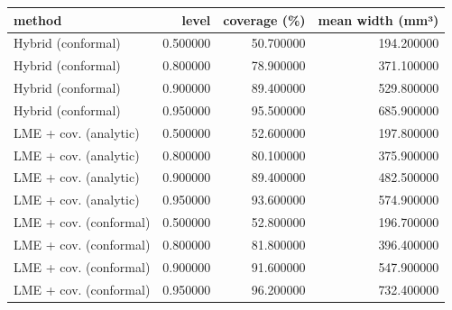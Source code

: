\begin{tabular}{lrrr}
\toprule
method & level & coverage (\%) & mean width (mm³) \\
\midrule
Hybrid (conformal) & 0.500000 & 50.700000 & 194.200000 \\
Hybrid (conformal) & 0.800000 & 78.900000 & 371.100000 \\
Hybrid (conformal) & 0.900000 & 89.400000 & 529.800000 \\
Hybrid (conformal) & 0.950000 & 95.500000 & 685.900000 \\
LME + cov. (analytic) & 0.500000 & 52.600000 & 197.800000 \\
LME + cov. (analytic) & 0.800000 & 80.100000 & 375.900000 \\
LME + cov. (analytic) & 0.900000 & 89.400000 & 482.500000 \\
LME + cov. (analytic) & 0.950000 & 93.600000 & 574.900000 \\
LME + cov. (conformal) & 0.500000 & 52.800000 & 196.700000 \\
LME + cov. (conformal) & 0.800000 & 81.800000 & 396.400000 \\
LME + cov. (conformal) & 0.900000 & 91.600000 & 547.900000 \\
LME + cov. (conformal) & 0.950000 & 96.200000 & 732.400000 \\
\bottomrule
\end{tabular}
